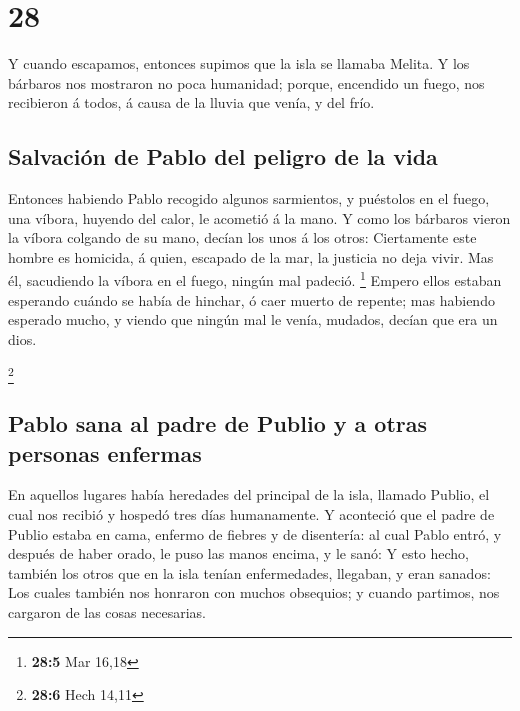 \hypertarget{section-27}{%
\section{28}\label{section-27}}

 Y cuando escapamos, entonces supimos que la isla se llamaba
Melita.  Y los bárbaros nos mostraron no poca humanidad;
porque, encendido un fuego, nos recibieron á todos, á causa de la lluvia
que venía, y del frío.

\hypertarget{salvaciuxf3n-de-pablo-del-peligro-de-la-vida}{%
\subsection{Salvación de Pablo del peligro de la
vida}\label{salvaciuxf3n-de-pablo-del-peligro-de-la-vida}}

 Entonces habiendo Pablo recogido algunos sarmientos, y
puéstolos en el fuego, una víbora, huyendo del calor, le acometió á la
mano.  Y como los bárbaros vieron la víbora colgando de su
mano, decían los unos á los otros: Ciertamente este hombre es homicida,
á quien, escapado de la mar, la justicia no deja vivir.  Mas
él, sacudiendo la víbora en el fuego, ningún mal padeció. \footnote{\textbf{28:5}
  Mar 16,18}  Empero ellos estaban esperando cuándo se había
de hinchar, ó caer muerto de repente; mas habiendo esperado mucho, y
viendo que ningún mal le venía, mudados, decían que era un dios.

\footnote{\textbf{28:6} Hech 14,11}

\hypertarget{pablo-sana-al-padre-de-publio-y-a-otras-personas-enfermas}{%
\subsection{Pablo sana al padre de Publio y a otras personas
enfermas}\label{pablo-sana-al-padre-de-publio-y-a-otras-personas-enfermas}}

 En aquellos lugares había heredades del principal de la
isla, llamado Publio, el cual nos recibió y hospedó tres días
humanamente.  Y aconteció que el padre de Publio estaba en
cama, enfermo de fiebres y de disentería: al cual Pablo entró, y después
de haber orado, le puso las manos encima, y le sanó:  Y esto
hecho, también los otros que en la isla tenían enfermedades, llegaban, y
eran sanados:  Los cuales también nos honraron con muchos
obsequios; y cuando partimos, nos cargaron de las cosas necesarias.

